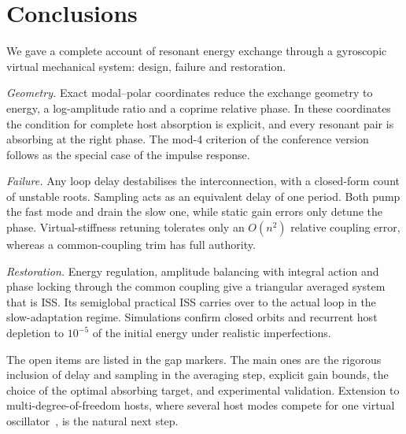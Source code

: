 \section{Conclusions}\label{sec:concl}

We gave a complete account of resonant energy exchange through a gyroscopic
virtual mechanical system: design, failure and restoration.

\emph{Geometry.} Exact modal--polar coordinates reduce the exchange geometry to
energy, a log-amplitude ratio and a coprime relative phase.
In these coordinates the condition for complete host absorption is explicit,
and every resonant pair is absorbing at the right phase.
The mod-4 criterion of the conference version follows as the special case of
the impulse response.

\emph{Failure.} Any loop delay destabilises the interconnection, with a
closed-form count of unstable roots.
Sampling acts as an equivalent delay of one period.
Both pump the fast mode and drain the slow one, while static gain errors only
detune the phase.
Virtual-stiffness retuning tolerates only an $O(n^2)$ relative coupling error,
whereas a common-coupling trim has full authority.

\emph{Restoration.} Energy regulation, amplitude balancing with integral action
and phase locking through the common coupling give a triangular averaged system
that is ISS.
Its semiglobal practical ISS carries over to the actual loop in the
slow-adaptation regime.
Simulations confirm closed orbits and recurrent host depletion to $10^{-5}$ of the
initial energy under realistic imperfections.

The open items are listed in the gap markers.
The main ones are the rigorous inclusion of delay and sampling in the averaging
step, explicit gain bounds, the choice of the optimal absorbing target, and
experimental validation.
Extension to multi-degree-of-freedom hosts, where several host modes compete for
one virtual oscillator~\citep{juchem2024virtual}, is the natural next step.

